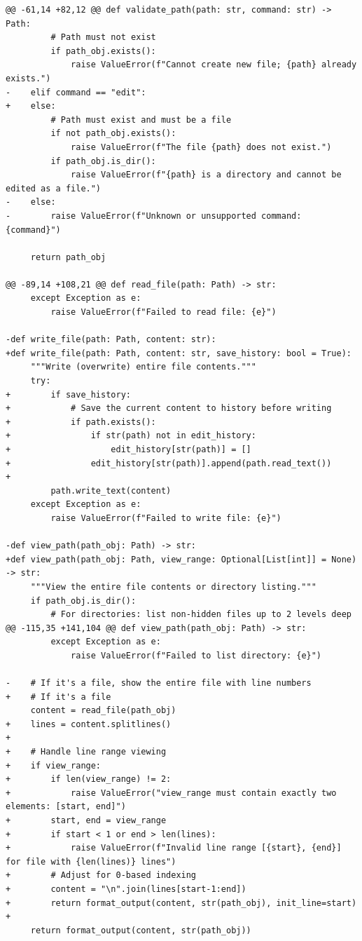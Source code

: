 \documentclass{article} %
\begin{document}
\begin{lstlisting}[style=diffstyle]
@@ -61,14 +82,12 @@ def validate_path(path: str, command: str) -> Path:
         # Path must not exist
         if path_obj.exists():
             raise ValueError(f"Cannot create new file; {path} already exists.")
-    elif command == "edit":
+    else:
         # Path must exist and must be a file
         if not path_obj.exists():
             raise ValueError(f"The file {path} does not exist.")
         if path_obj.is_dir():
             raise ValueError(f"{path} is a directory and cannot be edited as a file.")
-    else:
-        raise ValueError(f"Unknown or unsupported command: {command}")
 
     return path_obj
 
@@ -89,14 +108,21 @@ def read_file(path: Path) -> str:
     except Exception as e:
         raise ValueError(f"Failed to read file: {e}")
 
-def write_file(path: Path, content: str):
+def write_file(path: Path, content: str, save_history: bool = True):
     """Write (overwrite) entire file contents."""
     try:
+        if save_history:
+            # Save the current content to history before writing
+            if path.exists():
+                if str(path) not in edit_history:
+                    edit_history[str(path)] = []
+                edit_history[str(path)].append(path.read_text())
+
         path.write_text(content)
     except Exception as e:
         raise ValueError(f"Failed to write file: {e}")
 
-def view_path(path_obj: Path) -> str:
+def view_path(path_obj: Path, view_range: Optional[List[int]] = None) -> str:
     """View the entire file contents or directory listing."""
     if path_obj.is_dir():
         # For directories: list non-hidden files up to 2 levels deep
@@ -115,35 +141,104 @@ def view_path(path_obj: Path) -> str:
         except Exception as e:
             raise ValueError(f"Failed to list directory: {e}")
 
-    # If it's a file, show the entire file with line numbers
+    # If it's a file
     content = read_file(path_obj)
+    lines = content.splitlines()
+
+    # Handle line range viewing
+    if view_range:
+        if len(view_range) != 2:
+            raise ValueError("view_range must contain exactly two elements: [start, end]")
+        start, end = view_range
+        if start < 1 or end > len(lines):
+            raise ValueError(f"Invalid line range [{start}, {end}] for file with {len(lines)} lines")
+        # Adjust for 0-based indexing
+        content = "\n".join(lines[start-1:end])
+        return format_output(content, str(path_obj), init_line=start)
+
     return format_output(content, str(path_obj))
 

\end{lstlisting}
\end{document}
